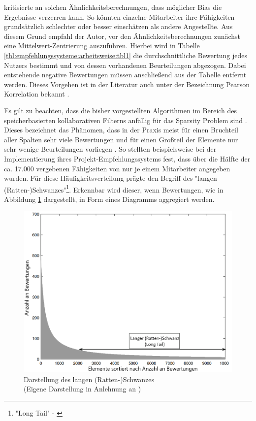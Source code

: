 \textcite[S. 35ff.]{recommenderSystems:2016} kritisierte an solchen Ähnlichkeitsberechnungen, dass möglicher Bias die Ergebnisse verzerren kann. So könnten einzelne Mitarbeiter ihre Fähigkeiten grundsätzlich schlechter oder besser einschätzen als andere Angestellte. Aus diesem Grund empfahl der Autor, vor den Ähnlichkeitsberechnungen zunächst eine Mittelwert-Zentrierung auszuführen. Hierbei wird in Tabelle \ref{tbl:empfehlungssysteme:arbeitsweise:tbl1} die durchschnittliche Bewertung jedes Nutzers bestimmt und von dessen vorhandenen Beurteilungen abgezogen. Dabei entstehende negative Bewertungen müssen anschließend aus der Tabelle entfernt werden. Dieses Vorgehen ist in der Literatur auch unter der Bezeichnung Pearson Korrelation bekannt \cite[S. 3]{bharti:2019}.

Es gilt zu beachten, dass die bisher vorgestellten Algorithmen im Bereich des speicherbasierten kollaborativen Filterns anfällig für das Sparsity Problem sind \cite[S. 3f.]{grvcar:2006}. Dieses bezeichnet das Phänomen, dass in der Praxis meist für einen Bruchteil aller Spalten sehr viele Bewertungen und für einen Großteil der Elemente nur sehr wenige Beurteilungen vorliegen \cite[S. 8]{recommenderSystems:2016}. So stellten beispielsweise \textcite[S. 3]{mitre:2014} bei der Implementierung ihres Projekt-Empfehlungssystems fest, dass über die Hälfte der ca. 17.000 vergebenen Fähigkeiten von nur je einem Mitarbeiter angegeben wurden.
Für diese Häufigkeitsverteilung prägte \textcite[S. 11, Z. 32]{anderson:2007} den Begriff des "langen (Ratten-)Schwanzes"\footnote{"Long Tail" - \textcite[S. 11, Z. 32]{anderson:2007}}. Erkennbar wird dieser, wenn Bewertungen, wie in Abbildung \ref{fig:empfehlungssysteme:cf:speicherbasiert:abb1} dargestellt, in Form eines Diagramms aggregiert werden.

\begin{figure}[h]
	\centering
	\includegraphics[width=1\textwidth]{gfx/long-tail.png}
	\caption[Darstellung des langen (Ratten-)Schwanzes]{Darstellung des langen (Ratten-)Schwanzes\\
		(Eigene Darstellung in Anlehnung an \cite[S. 33]{recommenderSystems:2016})}
	\label{fig:empfehlungssysteme:cf:speicherbasiert:abb1}
\end{figure}

